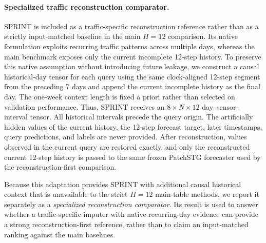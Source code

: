 
\paragraph{Specialized traffic reconstruction comparator.}
SPRINT is included as a traffic-specific reconstruction reference rather than as a strictly input-matched baseline in the main $H{=}12$ comparison. Its native formulation exploits recurring traffic patterns across multiple days, whereas the main benchmark exposes only the current incomplete 12-step history. To preserve this native assumption without introducing future leakage, we construct a causal historical-day tensor for each query using the same clock-aligned 12-step segment from the preceding 7 days and append the current incomplete history as the final day. The one-week context length is fixed a priori rather than selected on validation performance. Thus, SPRINT receives an $8\times N\times 12$ day--sensor--interval tensor. All historical intervals precede the query origin. The artificially hidden values of the current history, the 12-step forecast target, later timestamps, query predictions, and labels are never provided. After reconstruction, values observed in the current query are restored exactly, and only the reconstructed current 12-step history is passed to the same frozen PatchSTG forecaster used by the reconstruction-first comparison.

Because this adaptation provides SPRINT with additional causal historical context that is unavailable to the strict $H{=}12$ main-table methods, we report it separately as a \emph{specialized reconstruction comparator}. Its result is used to answer whether a traffic-specific imputer with native recurring-day evidence can provide a strong reconstruction-first reference, rather than to claim an input-matched ranking against the main baselines.

